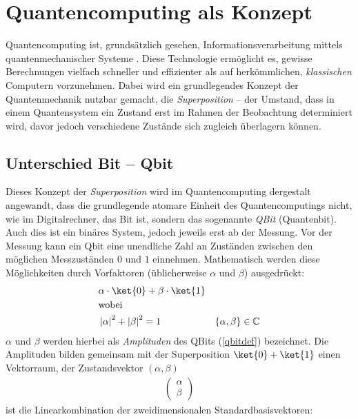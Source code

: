 \renewcommand*{\arraystretch}{1.0} %


\chapter{Quantencomputing als Konzept}
Quantencomputing ist, grundsätzlich gesehen, Informationsverarbeitung mittels quantenmechanischer Systeme \cite[1]{NielsenChuang}.
Diese Technologie ermöglicht es, gewisse Berechnungen vielfach schneller und effizienter als auf herkömmlichen, \textit{klassischen} Computern vorzunehmen. Dabei wird ein grundlegendes Konzept der Quantenmechanik nutzbar gemacht, die \textit{Superposition} -- der Umstand, dass in einem Quantensystem ein Zustand erst im Rahmen der Beobachtung determiniert wird, davor jedoch verschiedene Zustände sich zugleich überlagern können.


\section{Unterschied Bit -- Qbit}
Dieses Konzept der \textit{Superposition} wird im Quantencomputing dergestalt angewandt, dass die grundlegende atomare Einheit des Quantencomputings nicht, wie im Digitalrechner, das Bit ist, sondern das sogenannte \textit{QBit} (Quantenbit).
Auch dies ist ein binäres System, jedoch jeweils erst ab der Messung.
Vor der Messung kann ein Qbit eine unendliche Zahl an Zuständen zwischen den möglichen Messzuständen $0$ und $1$ einnehmen.
Mathematisch werden diese \glqq Möglichkeiten\grqq{} durch Vorfaktoren (üblicherweise $\alpha$ und $\beta$) ausgedrückt:
\begin{align}
&\alpha \cdot \ket{0}+\beta \cdot \ket{1} \label{qbitdef} \\
&\text{wobei}\notag \\ 
&\left\lvert \alpha \right\rvert ^2 + \left\lvert \beta \right\rvert ^2 = 1 & \{ \alpha, \beta \} \in \mathbb{C}
\end{align}
$\alpha$ und $\beta$ werden hierbei als \textit{Amplituden} des QBits 
(\ref{qbitdef})
bezeichnet.
Die Amplituden bilden gemeinsam mit der Superposition $\ket{0}+\ket{1}$ einen Vektorraum, der Zustandsvektor $(\alpha, \beta)$
\begin{align}
    \begin{pmatrix}
        \alpha\\
        \beta
    \end{pmatrix}
\end{align}
ist die Linearkombination der zweidimensionalen Standardbasisvektoren\cite[22]{Homeister}: 

